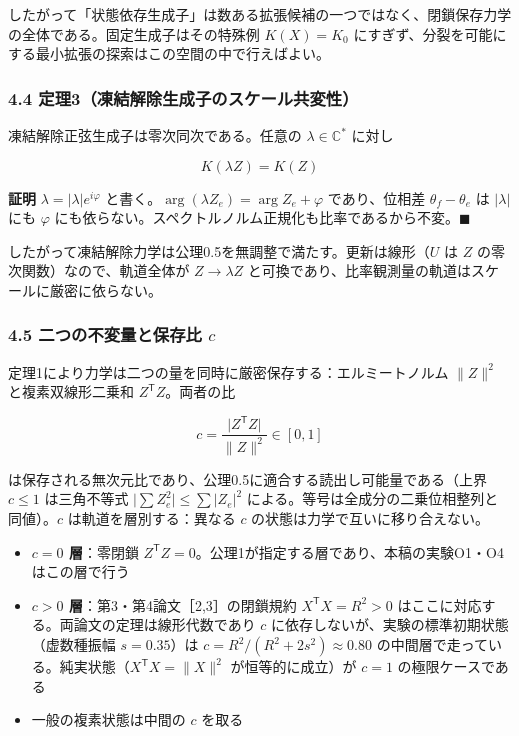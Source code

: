\documentclass[
  a4paper,
]{ltjsarticle}
\providecommand{\tightlist}{%
  \setlength{\itemsep}{0pt}\setlength{\parskip}{0pt}}
\begin{document}
したがって「状態依存生成子」は数ある拡張候補の一つではなく、閉鎖保存力学の全体である。固定生成子はその特殊例
\(K(X)=K_0\)
にすぎず、分裂を可能にする最小拡張の探索はこの空間の中で行えばよい。

\subsubsection{4.4
定理3（凍結解除生成子のスケール共変性）}\label{ux5b9aux74063ux51cdux7d50ux89e3ux9664ux751fux6210ux5b50ux306eux30b9ux30b1ux30fcux30ebux5171ux5909ux6027}

凍結解除正弦生成子は零次同次である。任意の \(\lambda\in\mathbb C^\ast\)
に対し

\[
K(\lambda Z)=K(Z)
\]

\textbf{証明} \(\lambda=|\lambda|e^{i\varphi}\)
と書く。\(\arg(\lambda Z_e)=\arg Z_e+\varphi\) であり、位相差
\(\theta_f-\theta_e\) は \(|\lambda|\) にも \(\varphi\)
にも依らない。スペクトルノルム正規化も比率であるから不変。\(\blacksquare\)

したがって凍結解除力学は公理0.5を無調整で満たす。更新は線形（\(U\) は
\(Z\) の零次関数）なので、軌道全体が \(Z\to\lambda Z\)
と可換であり、比率観測量の軌道はスケールに厳密に依らない。

\subsubsection{\texorpdfstring{4.5 二つの不変量と保存比
\(c\)}{4.5 二つの不変量と保存比 c}}\label{ux4e8cux3064ux306eux4e0dux5909ux91cfux3068ux4fddux5b58ux6bd4-c}

定理1により力学は二つの量を同時に厳密保存する：エルミートノルム
\(\lVert Z\rVert^2\) と複素双線形二乗和 \(Z^{\mathsf T}Z\)。両者の比

\[
c=\frac{\lvert Z^{\mathsf T}Z\rvert}{\lVert Z\rVert^2}\in[0,1]
\]

は保存される無次元比であり、公理0.5に適合する読出し可能量である（上界
\(c\le1\) は三角不等式
\(\lvert\sum Z_e^2\rvert\le\sum\lvert Z_e\rvert^2\)
による。等号は全成分の二乗位相整列と同値）。\(c\)
は軌道を層別する：異なる \(c\) の状態は力学で互いに移り合えない。

\begin{itemize}
\tightlist
\item
  \textbf{\(c=0\) 層}：零閉鎖
  \(Z^{\mathsf T}Z=0\)。公理1が指定する層であり、本稿の実験O1・O4はこの層で行う
\item
  \textbf{\(c>0\) 層}：第3・第4論文［2,3］の閉鎖規約
  \(X^{\mathsf T}X=R^2>0\)
  はここに対応する。両論文の定理は線形代数であり \(c\)
  に依存しないが、実験の標準初期状態（虚数種振幅 \(s=0.35\)）は
  \(c=R^2/(R^2+2s^2)\approx0.80\)
  の中間層で走っている。純実状態（\(X^{\mathsf T}X=\lVert X\rVert^2\)
  が恒等的に成立）が \(c=1\) の極限ケースである
\item
  一般の複素状態は中間の \(c\) を取る
\end{itemize}
\end{document}
